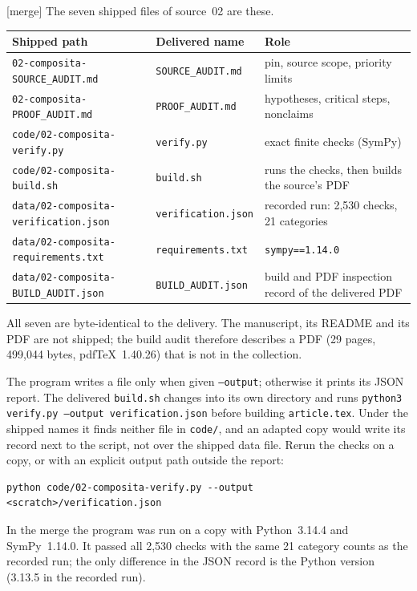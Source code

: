 \documentclass[11pt,letterpaper]{article}
\theoremstyle{definition}
\theoremstyle{remark}
\newcommand{\rpath}[1]{\nolinkurl{#1}}%
\newcommand{\mtag}{\textup{[merge]}}%
\numberwithin{equation}{section}
\begin{document}
\mtag{} The seven shipped files of source~02 are these.
\begin{center}\small
\begin{tabular}{@{}p{}p{}p{}@{}}
\toprule
Shipped path & Delivered name & Role\\
\midrule
\rpath{02-composita-SOURCE\_AUDIT.md} & \texttt{SOURCE\_AUDIT.md} & pin,
source scope, priority limits\\
\rpath{02-composita-PROOF\_AUDIT.md} & \texttt{PROOF\_AUDIT.md} &
hypotheses, critical steps, nonclaims\\
\rpath{code/02-composita-verify.py} & \texttt{verify.py} & exact finite
checks (SymPy)\\
\rpath{code/02-composita-build.sh} & \texttt{build.sh} & runs the checks,
then builds the source's PDF\\
\rpath{data/02-composita-verification.json} & \texttt{verification.json} &
recorded run: 2,530 checks, 21 categories\\
\rpath{data/02-composita-requirements.txt} & \texttt{requirements.txt} &
\texttt{sympy==1.14.0}\\
\rpath{data/02-composita-BUILD\_AUDIT.json} & \texttt{BUILD\_AUDIT.json} &
build and PDF inspection record of the delivered PDF\\
\bottomrule
\end{tabular}
\end{center}
All seven are byte-identical to the delivery. The manuscript, its README
and its PDF are not shipped; the build audit therefore describes a PDF (29
pages, 499{,}044 bytes, pdfTeX~1.40.26) that is not in the collection.

The program writes a file only when given \texttt{--output}; otherwise it
prints its JSON report. The delivered \texttt{build.sh} changes into its own
directory and runs \texttt{python3 verify.py --output verification.json}
before building \texttt{article.tex}. Under the shipped names it finds
neither file in \rpath{code/}, and an adapted copy would write its record
next to the script, not over the shipped data file. Rerun the checks on a
copy, or with an explicit output path outside the report:
\begin{verbatim}
python code/02-composita-verify.py --output <scratch>/verification.json
\end{verbatim}
In the merge the program was run on a copy with Python~3.14.4 and
SymPy~1.14.0. It passed all 2,530 checks with the same 21 category counts
as the recorded run; the only difference in the JSON record is the Python
version (3.13.5 in the recorded run).
\end{document}
